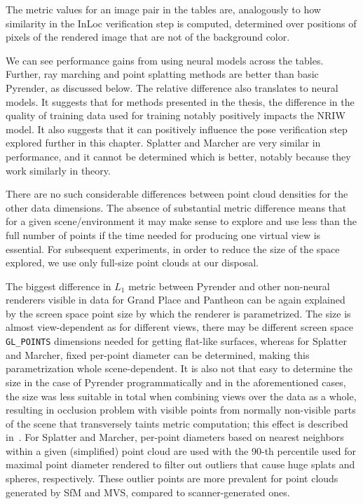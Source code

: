 The metric values for an image pair in the tables are, analogously to
how similarity in the InLoc verification step is computed, determined over
positions of pixels of the rendered image that are not
of the background color.

We can see performance gains from using neural models across the tables.
Further, ray marching and point splatting methods are better than basic
Pyrender, as discussed below. The relative difference also translates to
neural models. It suggests that for methods presented in the thesis, the
difference in the quality of training data used for training notably
positively impacts the NRIW model. It also suggests that it can positively
influence the pose verification step explored further in this chapter.
Splatter and Marcher are very similar in performance, and it cannot be
determined which is better, notably because they work similarly in theory.

There are no such considerable differences between point cloud densities
for the other data dimensions. The absence of substantial metric difference
means that for a given scene/environment it may make sense to explore and use
less than the full number of points if the time needed for producing one virtual
view is essential. For subsequent experiments, in order to reduce the size of
the space explored, we use only full-size point clouds at our disposal.

The biggest difference in $L_1$ metric between Pyrender and other non-neural
renderers visible in data for Grand Place and Pantheon can be again explained
by the screen space point size by which the renderer is parametrized. The size
is almost view-dependent as for different views, there may be different screen
space \verb|GL_POINTS| dimensions needed for getting flat-like surfaces, whereas
for Splatter and Marcher, fixed per-point diameter can be determined, making this
parametrization whole scene-dependent. It is also not that easy to determine
the size in the case of Pyrender programmatically and in the aforementioned
cases, the size was less suitable in total when combining views over the data
as a whole, resulting in occlusion problem with visible points from normally
non-visible parts of the scene that transversely taints metric computation;
this effect is described in~. For Splatter and Marcher,
per-point diameters based on nearest neighbors within a given (simplified) point
cloud are used with the 90-th percentile used for maximal point diameter rendered
to filter out outliers that cause huge splats and spheres, respectively. These
outlier points are more prevalent for point clouds generated by SfM and MVS,
compared to scanner-generated ones.\\

